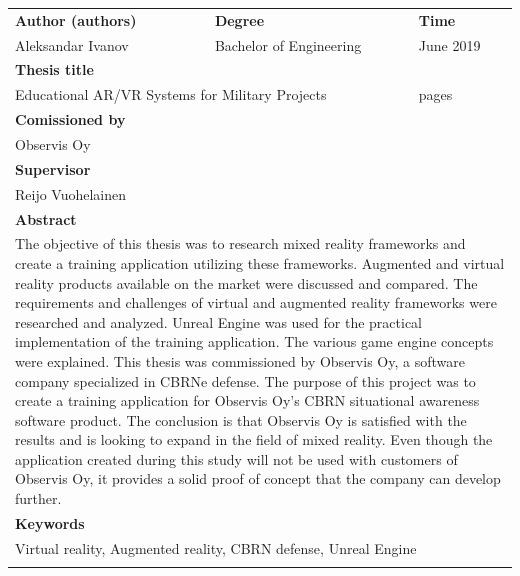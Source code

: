 \documentclass[12pt, a4paper,oneside, nocenter]{thesis}
\newcommand\blankpage{%
    \null
    \thispagestyle{empty}%
    \addtocounter{page}{-1}%
    \newpage}
\begin{document}
    \thispagestyle{empty}
		\noindent
		\newlength{\lengtha}
		\setlength{\lengtha}{.96\textwidth}
    \begin{tabularx}{\linewidth}{|XXXX|}
      \hline
	   \textbf{Author (authors)} &  \textbf{Degree} &  & \textbf{Time} \\
	   Aleksandar Ivanov &  \multicolumn{2}{l}{Bachelor of Engineering} & June 2019 \\
	   \hline
	   \textbf{Thesis title} & & & \\
	   \multicolumn{3}{|l}{Educational AR/VR Systems for Military Projects} & \pageref{LastPage} pages\\
	  \hline
		\textbf{Comissioned by} & & & \\
		Observis Oy & & & \\
	  \hline
	  \textbf{Supervisor} & & & \\
	  Reijo Vuohelainen & & & \\
	  \hline
		\textbf{Abstract} & & & \\
		\multicolumn{4}{|p{\lengtha}|}{\raggedright \setstretch{1.0} The objective of this thesis was to research mixed reality frameworks and create a training application utilizing these frameworks. Augmented and virtual reality  products available on the market were discussed and compared. The requirements and challenges of virtual and augmented reality frameworks were researched and analyzed. Unreal Engine was used for the practical implementation of the training application. The various game engine concepts were explained. 
		\linebreak
		\linebreak
		This thesis was commissioned by Observis Oy, a software company specialized in CBRNe defense. The purpose of this project was to create a training application for Observis Oy's CBRN situational awareness software product. 
		\linebreak
		\linebreak
		The conclusion is that Observis Oy is satisfied with the results and is looking to expand in the field of mixed reality. Even though the application created during this study will not be used with customers of Observis Oy, it provides a solid proof of concept that the company can develop further.
		} \\
	  \hline
	  \textbf{Keywords} & & & \\
	  \multicolumn{4}{|p{\lengtha}|}{\raggedright \setstretch{1.0} Virtual reality, Augmented reality, CBRN defense, Unreal Engine } \\
	  & & & \\
	  \hline
    \end{tabularx}
\end{document}
